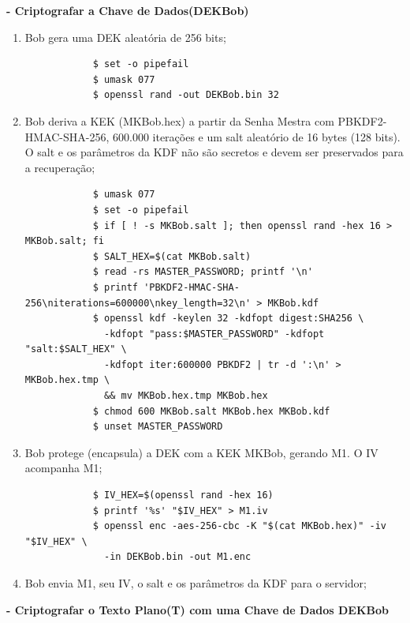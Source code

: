 \textbf{- Criptografar a Chave de Dados(DEKBob)}

\begin{enumerate}
	\item Bob gera uma DEK aleatória de 256 bits;
	\begin{tcolorbox}[width=\textwidth]
		{\normalsize
			\begin{verbatim}
			$ set -o pipefail
			$ umask 077
			$ openssl rand -out DEKBob.bin 32
			\end{verbatim}
		}
	\end{tcolorbox}
	\item Bob deriva a KEK (MKBob.hex) a partir da Senha Mestra com PBKDF2-HMAC-SHA-256, 600.000 iterações e um salt aleatório de 16 bytes (128 bits). O salt e os parâmetros da KDF não são secretos e devem ser preservados para a recuperação;
	\begin{tcolorbox}[width=\textwidth]
		{\footnotesize
			\begin{verbatim}
			$ umask 077
			$ set -o pipefail
			$ if [ ! -s MKBob.salt ]; then openssl rand -hex 16 > MKBob.salt; fi
			$ SALT_HEX=$(cat MKBob.salt)
			$ read -rs MASTER_PASSWORD; printf '\n'
			$ printf 'PBKDF2-HMAC-SHA-256\niterations=600000\nkey_length=32\n' > MKBob.kdf
			$ openssl kdf -keylen 32 -kdfopt digest:SHA256 \
			  -kdfopt "pass:$MASTER_PASSWORD" -kdfopt "salt:$SALT_HEX" \
			  -kdfopt iter:600000 PBKDF2 | tr -d ':\n' > MKBob.hex.tmp \
			  && mv MKBob.hex.tmp MKBob.hex
			$ chmod 600 MKBob.salt MKBob.hex MKBob.kdf
			$ unset MASTER_PASSWORD
			\end{verbatim}
		}
	\end{tcolorbox}
	\item Bob protege (encapsula) a DEK com a KEK MKBob, gerando M1. O IV acompanha M1;
	\begin{tcolorbox}[width=\textwidth]
		{\scriptsize
			\begin{verbatim}
			$ IV_HEX=$(openssl rand -hex 16)
			$ printf '%s' "$IV_HEX" > M1.iv
			$ openssl enc -aes-256-cbc -K "$(cat MKBob.hex)" -iv "$IV_HEX" \
			  -in DEKBob.bin -out M1.enc
			\end{verbatim}
		}
	\end{tcolorbox}
	\item Bob envia M1, seu IV, o salt e os parâmetros da KDF para o servidor;
\end{enumerate}

\textbf{- Criptografar o Texto Plano(T) com uma Chave de Dados DEKBob}

